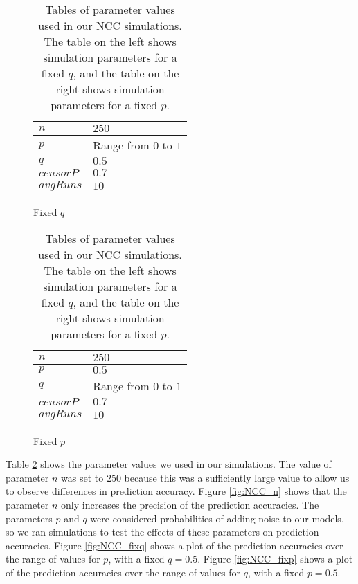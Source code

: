 \begin{table}[H]
\centering
\begin{subfigure}[h]{0.4\linewidth}
\begin{tabular}{|l|l|}
\hline
$n$ & $250$ \\ \hline
$p$ & Range from $0$ to $1$\\ \hline
$q$ & $0.5$\\ \hline
$censorP$ & $0.7$\\ \hline
$avgRuns$ & $10$\\ \hline
\end{tabular}
\caption{Fixed $q$}
\end{subfigure}
\hfill
\begin{subfigure}[h]{0.4\linewidth}
\begin{tabular}{|l|l|}
\hline
$n$ & $250$ \\ \hline
$p$ & $0.5$\\ \hline
$q$ & Range from $0$ to $1$\\ \hline
$censorP$ & $0.7$\\ \hline
$avgRuns$ & $10$\\ \hline
\end{tabular}
\caption{Fixed $p$}
\end{subfigure}%
\caption{Tables of parameter values used in our NCC simulations. The table
on the left shows simulation parameters for a fixed $q$, and the table on
the right shows simulation parameters for a fixed $p$.}
\label{table:NCC-params}
\end{table}

Table \ref{table:NCC-params} shows the parameter values we used in our
simulations. The value of parameter $n$ was set to $250$ because this was a
sufficiently large value to allow us to observe differences in prediction
accuracy. Figure \ref{fig:NCC_n} shows that the parameter $n$ only
increases the precision of the prediction accuracies. The parameters $p$
and $q$ were considered probabilities of adding noise to our models, so we
ran simulations to test the effects of these parameters on prediction
accuracies. Figure \ref{fig:NCC_fixq} shows a plot of the prediction
accuracies over the range of values for $p$, with a fixed $q=0.5$. Figure
\ref{fig:NCC_fixp} shows a plot of the prediction accuracies over the range
of values for $q$, with a fixed $p=0.5$.

